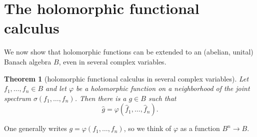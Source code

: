 \documentclass[12pt]{report}
\newtheorem{theorem}{Theorem}[chapter]
\theoremstyle{definition}
\begin{document}
\section{The holomorphic functional calculus}
We now show that holomorphic functions can be extended to an (abelian, unital) Banach algebra $B$, even in several complex variables.
\begin{theorem}[holomorphic functional calculus in several complex variables]
    Let $f_1, \dots, f_n \in B$ and let $\varphi$ be a holomorphic function on a neighborhood of the joint spectrum $\sigma(f_1, \dots, f_n)$. Then there is a $g \in B$ such that
    $$\hat g = \varphi(\hat f_1, \dots, \hat f_n).$$
\end{theorem}
One generally writes $g = \varphi(f_1, \dots, f_n)$, so we think of $\varphi$ as a function $B^n \to B$.
    
\end{document}
